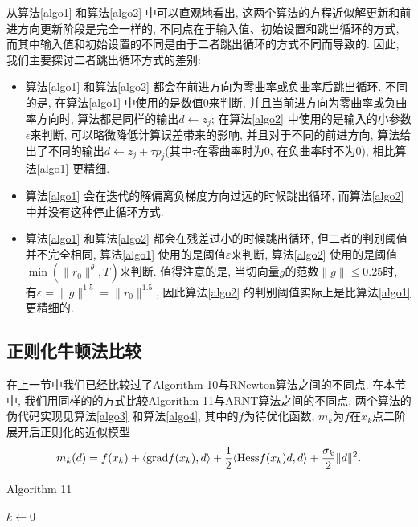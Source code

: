 \documentclass[UTF8]{ctexart}
\begin{document}
从算法\ref{algo1} 和算法\ref{algo2} 中可以直观地看出, 这两个算法的方程近似解更新和前进方向更新阶段是完全一样的, 不同点在于输入值、初始设置和跳出循环的方式, 而其中输入值和初始设置的不同是由于二者跳出循环的方式不同而导致的. 因此, 我们主要探讨二者跳出循环方式的差别: 
\begin{itemize}
    \item 算法\ref{algo1} 和算法\ref{algo2} 都会在前进方向为零曲率或负曲率后跳出循环. 不同的是, 在算法\ref{algo1} 中使用的是数值$0$来判断, 并且当前进方向为零曲率或负曲率方向时, 算法都是同样的输出$d\leftarrow z_j$; 在算法\ref{algo2} 中使用的是输入的小参数$\epsilon$来判断, 可以略微降低计算误差带来的影响, 并且对于不同的前进方向, 算法给出了不同的输出$d\leftarrow z_j+\tau p_j$(其中$\tau$在零曲率时为$0$, 在负曲率时不为$0$), 相比算法\ref{algo1} 更精细. 
    \item 算法\ref{algo1} 会在迭代的解偏离负梯度方向过远的时候跳出循环, 而算法\ref{algo2} 中并没有这种停止循环方式. 
    \item 算法\ref{algo1} 和算法\ref{algo2} 都会在残差过小的时候跳出循环, 但二者的判别阈值并不完全相同, 算法\ref{algo1} 使用的是阈值$\varepsilon$来判断, 算法\ref{algo2} 使用的是阈值$\min(\lVert r_{0}\rVert^{\theta},T)$来判断. 值得注意的是, 当切向量$g$的范数$\lVert g\rVert\leq 0.25$时, 有$\varepsilon=\lVert g\rVert^{1.5}=\lVert r_{0}\rVert^{1.5}$, 因此算法\ref{algo2} 的判别阈值实际上是比算法\ref{algo1} 更精细的. 
\end{itemize}

\subsection{正则化牛顿法比较}

在上一节中我们已经比较过了Algorithm 10与RNewton算法之间的不同点. 在本节中, 我们用同样的的方式比较Algorithm 11与ARNT算法之间的不同点, 两个算法的伪代码实现见算法\ref{algo3} 和算法\ref{algo4}, 其中的$f$为待优化函数, $m_k$为$f$在$x_k$点二阶展开后正则化的近似模型
\[m_k(d)=f(x_k)+\langle \textup{grad}f(x_k),d\rangle+\frac{1}{2}\langle \textup{Hess}f(x_k)d,d\rangle+\frac{\sigma_k}{2}\lVert d\rVert^2.\]

\begin{algorithm}[htb]
    \caption{Algorithm 11}\label{algo3}
    $k\leftarrow 0$\;
\end{algorithm}
\end{document}
